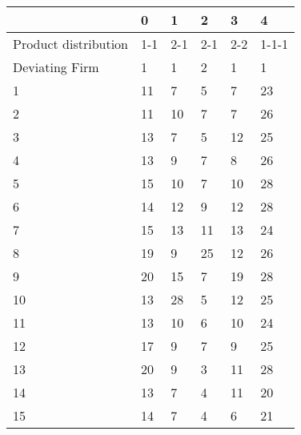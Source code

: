 \begin{tabular}{llllll}
\toprule
 & 0 & 1 & 2 & 3 & 4 \\
\midrule
Product distribution & 1-1 & 2-1  & 2-1  & 2-2  & 1-1-1 \\
Deviating Firm & 1 & 1 & 2 & 1 & 1 \\
1 & 11 & 7 & 5 & 7 & 23 \\
2 & 11 & 10 & 7 & 7 & 26 \\
3 & 13 & 7 & 5 & 12 & 25 \\
4 & 13 & 9 & 7 & 8 & 26 \\
5 & 15 & 10 & 7 & 10 & 28 \\
6 & 14 & 12 & 9 & 12 & 28 \\
7 & 15 & 13 & 11 & 13 & 24 \\
8 & 19 & 9 & 25 & 12 & 26 \\
9 & 20 & 15 & 7 & 19 & 28 \\
10 & 13 & 28 & 5 & 12 & 25 \\
11 & 13 & 10 & 6 & 10 & 24 \\
12 & 17 & 9 & 7 & 9 & 25 \\
13 & 20 & 9 & 3 & 11 & 28 \\
14 & 13 & 7 & 4 & 11 & 20 \\
15 & 14 & 7 & 4 & 6 & 21 \\
\bottomrule
\end{tabular}
